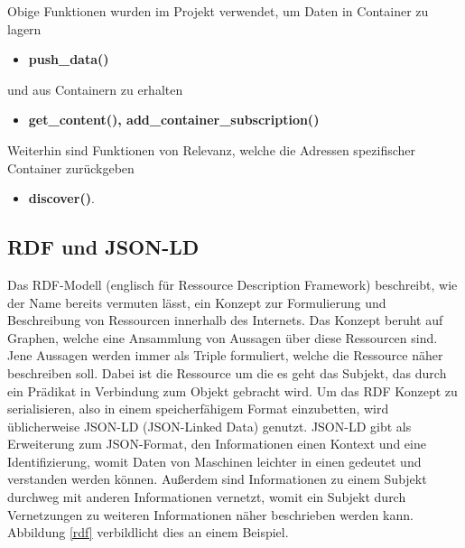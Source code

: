 \documentclass[
	12pt,								%
	DIV10,
	a4paper,         		%
	oneside,						%
	parskip=half,				%
	headings=normal,			%
	listof=totoc,					%
	bibliography=totoc,						%
	index=totoc,						%
	final								%
]{scrartcl}
\begin{document}
Obige Funktionen wurden im Projekt verwendet, um Daten in Container zu lagern 
\begin{itemize}
\item \textbf{push\_data()}
\end{itemize} 
und aus Containern zu erhalten
\begin{itemize}
\item \textbf{get\_content(), add\_container\_subscription()}
\end{itemize} 
Weiterhin sind Funktionen von Relevanz, welche die Adressen spezifischer Container zurückgeben
\begin{itemize}
\item \textbf{discover()}.
\end{itemize} 
\subsection{RDF und JSON-LD}
Das RDF-Modell (englisch für Ressource Description Framework) beschreibt, wie der Name bereits vermuten lässt, ein Konzept zur Formulierung und Beschreibung von Ressourcen innerhalb des Internets. Das Konzept beruht auf Graphen, welche eine Ansammlung von Aussagen über diese Ressourcen sind. Jene Aussagen werden immer als Triple formuliert, welche die Ressource näher beschreiben soll. Dabei ist die Ressource um die es geht das Subjekt, das durch ein Prädikat in Verbindung zum Objekt gebracht wird. 
Um das RDF Konzept zu serialisieren, also in einem speicherfähigem Format einzubetten, wird üblicherweise JSON-LD (JSON-Linked Data) genutzt. JSON-LD gibt als Erweiterung zum JSON-Format, den Informationen einen Kontext und eine Identifizierung, womit Daten von Maschinen leichter in einen gedeutet und verstanden werden können. Außerdem sind Informationen zu einem Subjekt durchweg mit anderen Informationen vernetzt, womit ein Subjekt durch Vernetzungen zu weiteren Informationen näher beschrieben werden kann. Abbildung \ref{rdf} verbildlicht dies an einem Beispiel.
\end{document}
